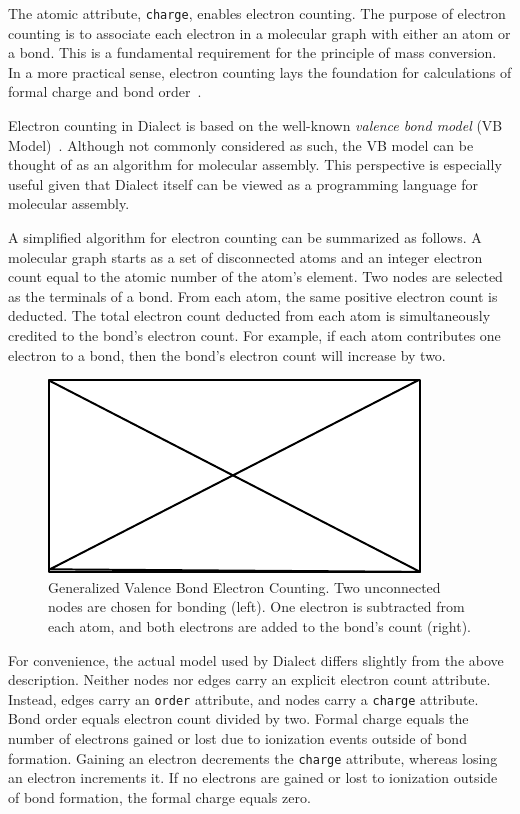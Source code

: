 \documentclass{article}
\def\ttt{\texttt}
\begin{document}
The atomic attribute, \ttt{charge}, enables electron counting. The purpose of electron counting is to associate each electron in a molecular graph with either an atom or a bond. This is a fundamental requirement for the principle of mass conversion. In a more practical sense, electron counting lays the foundation for calculations of formal charge and bond order~\cite{dietz:1995}.

Electron counting in Dialect is based on the well-known \textit{valence bond model} (VB Model)~\cite{lewis:1916}. Although not commonly considered as such, the VB model can be thought of as an algorithm for molecular assembly. This perspective is especially useful given that Dialect itself can be viewed as a programming language for molecular assembly.

A simplified algorithm for electron counting can be summarized as follows. A molecular graph starts as a set of disconnected atoms and an integer electron count equal to the atomic number of the atom's element. Two nodes are selected as the terminals of a bond. From each atom, the same positive electron count is deducted. The total electron count deducted from each atom is simultaneously credited to the bond's electron count. For example, if each atom contributes one electron to a bond, then the bond's electron count will increase by two.

\begin{figure}
    \centering
    \includegraphics{filler}
    \caption{Generalized Valence Bond Electron Counting. Two unconnected nodes are chosen for bonding (left). One electron is subtracted from each atom, and both electrons are added to the bond's count (right).}
    \label{fig:electron-counting}
\end{figure}

For convenience, the actual model used by Dialect differs slightly from the above description. Neither nodes nor edges carry an explicit electron count attribute. Instead, edges carry an \ttt{order} attribute, and nodes carry a \ttt{charge} attribute. Bond order equals electron count divided by two. Formal charge equals the number of electrons gained or lost due to ionization events outside of bond formation. Gaining an electron decrements the \ttt{charge} attribute, whereas losing an electron increments it. If no electrons are gained or lost to ionization outside of bond formation, the formal charge equals zero. 
\end{document}
